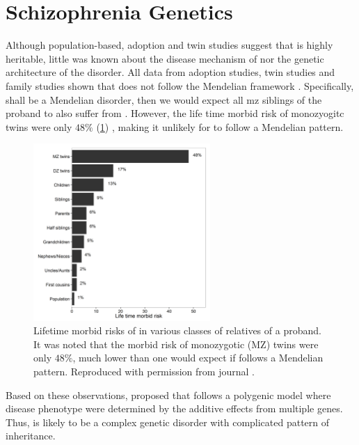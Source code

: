 	\section{Schizophrenia Genetics}
	Although population-based, adoption and twin studies suggest that  is highly heritable, little was known about the disease mechanism of  nor the genetic architecture of the disorder. 
	All data from adoption studies, twin studies and family studies shown that  does not follow the Mendelian framework \citep{Gottesman1967,Gottesman1982}.
	Specifically, shall  be a Mendelian disorder, then we would expect all \gls{mz} siblings of the proband to also suffer from .
	However, the life time morbid risk of monozyogitc twins were only $48\%$ (\cref{fig:lifeMRscz}) \citep{gottesman1991schizophrenia}, making it unlikely for  to follow a Mendelian pattern.
	\begin{figure}[t]
		\centering
		\includegraphics[width=0.6\textwidth]{figure/lifeTimeMorbidRisk.png}
		\caption[Lifetime morbid risks of  in various classes of relatives of a proband]{Lifetime morbid risks of  in various classes of relatives of a proband.
			It was noted that the morbid risk of monozygotic (MZ) twins were only $48\%$, much lower than one would expect if  follows a Mendelian pattern.
			Reproduced with permission from journal \citep{Riley2006}. \label{fig:lifeMRscz}}
	\end{figure}
	
	Based on these observations, \citet{Gottesman1967} proposed that  follows a polygenic model where disease phenotype were determined by the additive effects from multiple genes.
	Thus,  is likely to be a complex genetic disorder with complicated pattern of inheritance. 
	
